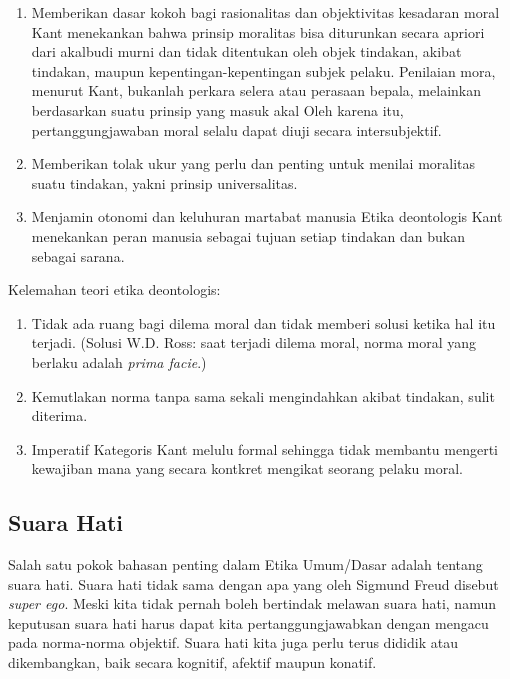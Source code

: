 \documentclass[10pt,a4paper]{article}
\renewenvironment{quote}
{\list{}{%
       \leftmargin 1.5em 
       \rightmargin 0em}
   \item\relax}
{\endlist}
\def\tightlist{}
\begin{document}
\begin{multicols}{2}
\begin{itemize}
  \begin{enumerate}
  \def\labelenumi{\arabic{enumi}.}
  \tightlist
  \item
    Memberikan dasar kokoh bagi rasionalitas dan objektivitas kesadaran
    moral Kant menekankan bahwa prinsip moralitas bisa diturunkan secara
    apriori dari akalbudi murni dan tidak ditentukan oleh objek
    tindakan, akibat tindakan, maupun kepentingan-kepentingan subjek
    pelaku. Penilaian mora, menurut Kant, bukanlah perkara selera atau
    perasaan bepala, melainkan berdasarkan suatu prinsip yang masuk akal
    Oleh karena itu, pertanggungjawaban moral selalu dapat diuji secara
    intersubjektif.
  \item
    Memberikan tolak ukur yang perlu dan penting untuk menilai moralitas
    suatu tindakan, yakni prinsip universalitas.
  \item
    Menjamin otonomi dan keluhuran martabat manusia Etika deontologis
    Kant menekankan peran manusia sebagai tujuan setiap tindakan dan
    bukan sebagai sarana.
  \end{enumerate}

  Kelemahan teori etika deontologis:

  \begin{enumerate}
  \def\labelenumi{\arabic{enumi}.}
  \tightlist
  \item
    Tidak ada ruang bagi dilema moral dan tidak memberi solusi ketika
    hal itu terjadi. (Solusi W.D. Ross: saat terjadi dilema moral, norma
    moral yang berlaku adalah \emph{prima facie}.)
  \item
    Kemutlakan norma tanpa sama sekali mengindahkan akibat tindakan,
    sulit diterima.
  \item
    Imperatif Kategoris Kant melulu formal sehingga tidak membantu
    mengerti kewajiban mana yang secara kontkret mengikat seorang pelaku
    moral.
  \end{enumerate}
\end{itemize}

\hypertarget{suara-hati}{%
\subsection{Suara Hati}\label{suara-hati}}

\begin{quote}
Salah satu pokok bahasan penting dalam Etika Umum/Dasar adalah tentang
suara hati. Suara hati tidak sama dengan apa yang oleh Sigmund Freud
disebut \emph{super ego}. Meski kita tidak pernah boleh bertindak
melawan suara hati, namun keputusan suara hati harus dapat kita
pertanggungjawabkan dengan mengacu pada norma-norma objektif. Suara hati
kita juga perlu terus dididik atau dikembangkan, baik secara kognitif,
afektif maupun konatif.
\end{quote}


\end{multicols}
\end{document}
